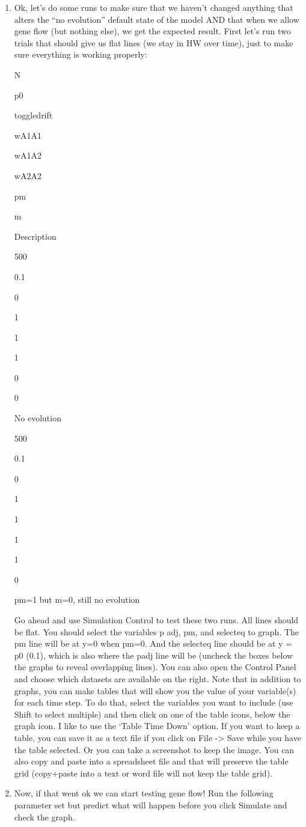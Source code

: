 \begin{enumerate}
\def\labelenumi{\arabic{enumi}.}
\setcounter{enumi}{4}
\item
  Ok, let's do some runs to make sure that we haven't changed anything
  that alters the ``no evolution'' default state of the model AND that
  when we allow gene flow (but nothing else), we get the expected
  result. First let's run two trials that should give us flat lines (we
  stay in HW over time), just to make sure everything is working
  properly:

  N

  p0

  toggledrift

  wA1A1

  wA1A2

  wA2A2

  pm

  m

  Description

  500

  0.1

  0

  1

  1

  1

  0

  0

  No evolution

  500

  0.1

  0

  1

  1

  1

  1

  0

  pm=1 but m=0, still no evolution

  Go ahead and use Simulation Control to test these two runs. All lines
  should be flat. You should select the variables p adj, pm, and
  selecteq to graph. The pm line will be at y=0 when pm=0. And the
  selecteq line should be at y = p0 (0.1), which is also where the padj
  line will be (uncheck the boxes below the graphs to reveal overlapping
  lines). You can also open the Control Panel and choose which datasets
  are available on the right. Note that in addition to graphs, you can
  make tables that will show you the value of your variable(s) for each
  time step. To do that, select the variables you want to include (use
  Shift to select multiple) and then click on one of the table icons,
  below the graph icon. I like to use the `Table Time Down' option. If
  you want to keep a table, you can save it as a text file if you click
  on File -\textgreater{} Save while you have the table selected. Or you
  can take a screenshot to keep the image. You can also copy and paste
  into a spreadsheet file and that will preserve the table grid
  (copy+paste into a text or word file will not keep the table grid).
\item
  Now, if that went ok we can start testing gene flow! Run the following
  parameter set but predict what will happen before you click Simulate
  and check the graph.


\end{enumerate}
